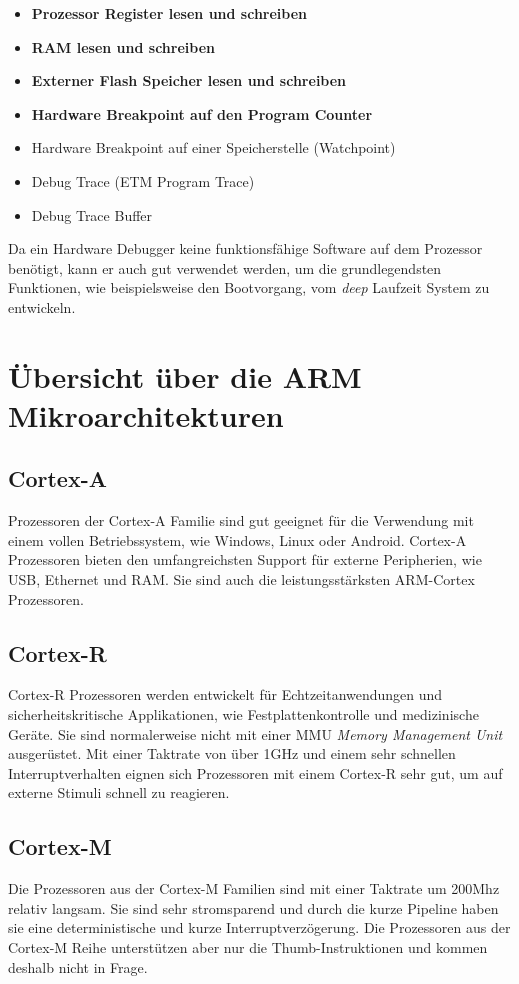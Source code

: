 \begin{itemize}
	\item \textbf{Prozessor Register lesen und schreiben}
	\item \textbf{RAM lesen und schreiben}
	\item \textbf{Externer Flash Speicher lesen und schreiben} 
	\item \textbf{Hardware Breakpoint auf den Program Counter} 
	\item Hardware Breakpoint auf einer Speicherstelle (Watchpoint)
	\item Debug Trace (ETM Program Trace) 
	\item Debug Trace Buffer
\end{itemize}

Da ein Hardware Debugger keine funktionsfähige Software auf dem Prozessor benötigt, kann er auch gut verwendet werden, um die grundlegendsten Funktionen, wie beispielsweise den Bootvorgang, vom \textit{deep} Laufzeit System zu entwickeln.




\section{Übersicht über die ARM Mikroarchitekturen}
\subsection{Cortex-A}
Prozessoren der Cortex-A Familie sind gut geeignet für die Verwendung mit einem vollen Betriebssystem, wie Windows, Linux oder Android.
Cortex-A Prozessoren bieten den umfangreichsten Support für externe Peripherien, wie USB, Ethernet und RAM.
Sie sind auch die leistungsstärksten ARM-Cortex Prozessoren.

\subsection{Cortex-R}
Cortex-R Prozessoren werden entwickelt für Echtzeitanwendungen und sicherheitskritische Applikationen, wie Festplattenkontrolle und medizinische Geräte.
Sie sind normalerweise nicht mit einer MMU \textit{Memory Management Unit} ausgerüstet.
Mit einer Taktrate von über 1GHz und einem sehr schnellen Interruptverhalten eignen sich Prozessoren mit einem Cortex-R sehr gut, um auf externe Stimuli schnell zu reagieren.

\subsection{Cortex-M}
Die Prozessoren aus der Cortex-M Familien sind mit einer Taktrate um 200Mhz relativ langsam.
Sie sind sehr stromsparend und durch die kurze Pipeline haben sie eine deterministische und kurze Interruptverzögerung.
Die Prozessoren aus der Cortex-M Reihe unterstützen aber nur die Thumb-Instruktionen und kommen deshalb nicht in Frage.


